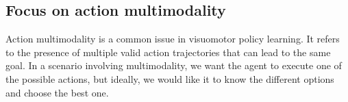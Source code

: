 \subsection{Focus on action multimodality}\label{sec:action_multimodality}

Action multimodality is a common issue in visuomotor policy learning. It refers to the presence of multiple
valid action trajectories that can lead to the same goal. In a scenario involving multimodality, we want the
agent to execute one of the possible actions, but ideally, we would like it to know the different options
and choose the best one.

